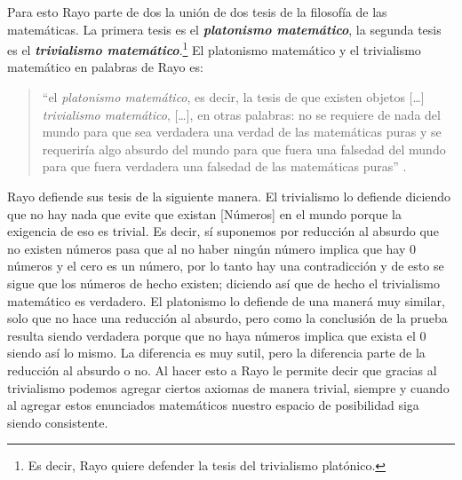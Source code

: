 \documentclass[]{article}
\begin{document}
Para esto Rayo parte de dos la unión de dos tesis de la filosofía de 
las matemáticas. La primera tesis es el \textit{\textbf{platonismo 
matemático}}, la segunda tesis es el \textit{\textbf{trivialismo 
matemático}}.\footnote{Es decir, Rayo quiere defender la tesis 
del trivialismo plat\'onico.
} El platonismo matemático y el trivialismo matemático 
en palabras de Rayo es: 
\begin{quotation} 
    \noindent \small``el \textit{platonismo matemático}, es 
    decir, la tesis de que existen objetos [\dots] \textit{trivialismo
    matemático}, [\dots], en otras palabras: no se requiere de nada del 
    mundo para que sea verdadera una verdad de las matemáticas 
    puras y se requeriría algo absurdo del mundo para que 
    fuera una falsedad del mundo para que fuera verdadera 
    una falsedad de las matemáticas puras'' \cite{rayo2013}.
\end{quotation} 

Rayo defiende sus tesis de la siguiente manera. El trivialismo 
lo defiende diciendo que no hay nada que evite que existan [Números]
en el mundo porque la exigencia de eso es trivial. Es decir, 
sí suponemos por reducción al absurdo que no existen números 
pasa que al no haber ningún número implica que hay 0 números y 
el cero es un número, por lo tanto hay una contradicción y de 
esto se sigue que los números de hecho existen; diciendo así 
que de hecho el trivialismo matemático es verdadero.
El platonismo lo defiende de una manerá muy similar, solo que no 
hace una reducción al absurdo, pero como la conclusión de la prueba 
resulta siendo verdadera porque que no haya números implica que 
exista el 0 siendo así lo mismo. La diferencia es muy sutil,
pero la diferencia parte de la reducción al absurdo o no. 
Al hacer esto a Rayo le permite decir que gracias al trivialismo 
podemos agregar ciertos axiomas de manera trivial, siempre 
y cuando al agregar estos enunciados matemáticos nuestro 
espacio de posibilidad siga siendo consistente.   
\end{document}
